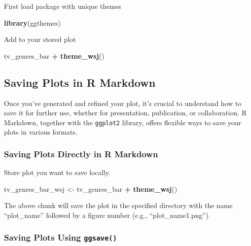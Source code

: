 \documentclass[
]{book}
\newenvironment{Shaded}{\begin{snugshade}}{\end{snugshade}}
\newcommand{\FunctionTok}[1]{\textcolor[rgb]{0.13,0.29,0.53}{\textbf{#1}}}
\newcommand{\NormalTok}[1]{#1}
\newcommand{\OtherTok}[1]{\textcolor[rgb]{0.56,0.35,0.01}{#1}}
\newcommand{\SpecialCharTok}[1]{\textcolor[rgb]{0.81,0.36,0.00}{\textbf{#1}}}
\begin{document}
First load package with unique themes

\begin{Shaded}
\begin{Highlighting}[]
\FunctionTok{library}\NormalTok{(ggthemes)}
\end{Highlighting}
\end{Shaded}

Add to your stored plot

\begin{Shaded}
\begin{Highlighting}[]
\NormalTok{tv\_genres\_bar }\SpecialCharTok{+}
  \FunctionTok{theme\_wsj}\NormalTok{()}
\end{Highlighting}
\end{Shaded}

\subsection*{Saving Plots in R Markdown}\label{saving-plots-in-r-markdown}

Once you've generated and refined your plot, it's crucial to understand how to save it for further use, whether for presentation, publication, or collaboration. R Markdown, together with the \texttt{ggplot2} library, offers flexible ways to save your plots in various formats.

\subsubsection*{Saving Plots Directly in R Markdown}\label{saving-plots-directly-in-r-markdown}

Store plot you want to save locally.

\begin{Shaded}
\begin{Highlighting}[]
\NormalTok{tv\_genres\_bar\_wsj }\OtherTok{\textless{}{-}}\NormalTok{ tv\_genres\_bar }\SpecialCharTok{+}
  \FunctionTok{theme\_wsj}\NormalTok{()}
\end{Highlighting}
\end{Shaded}

The above chunk will save the plot in the specified directory with the name ``plot\_name'' followed by a figure number (e.g., ``plot\_name1.png'').

\subsubsection*{\texorpdfstring{Saving Plots Using \texttt{ggsave()}}{Saving Plots Using ggsave()}}\label{saving-plots-using-ggsave}
\end{document}
